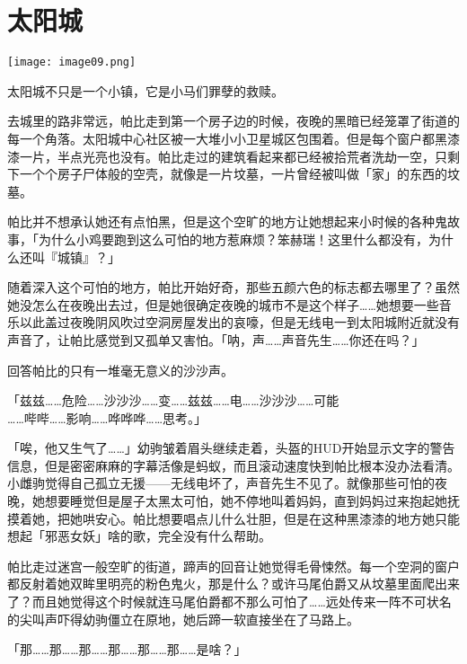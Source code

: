 \chapter{太阳城}

\texttt{[image: image09.png]}

\begin{intro}
太阳城不只是一个小镇，它是小马们罪孽的救赎。
\end{intro}


去城里的路非常远，帕比走到第一个房子边的时候，夜晚的黑暗已经笼罩了街道的每一个角落。太阳城中心社区被一大堆小小卫星城区包围着。但是每个窗户都黑漆漆一片，半点光亮也没有。帕比走过的建筑看起来都已经被拾荒者洗劫一空，只剩下一个个房子尸体般的空壳，就像是一片坟墓，一片曾经被叫做「家」的东西的坟墓。

帕比并不想承认她还有点怕黑，但是这个空旷的地方让她想起来小时候的各种鬼故事，「为什么小鸡要跑到这么可怕的地方惹麻烦？笨赫瑞！这里什么都没有，为什么还叫『城镇』？」

随着深入这个可怕的地方，帕比开始好奇，那些五颜六色的标志都去哪里了？虽然她没怎么在夜晚出去过，但是她很确定夜晚的城市不是这个样子……她想要一些音乐以此盖过夜晚阴风吹过空洞房屋发出的哀嚎，但是无线电一到太阳城附近就没有声音了，让帕比感觉到又孤单又害怕。「呐，声……声音先生……你还在吗？」

回答帕比的只有一堆毫无意义的沙沙声。

「{\mtzh 兹兹……危险……沙沙沙……变……兹兹……电……沙沙沙……可能\\……哔哔……影响……哗哗哗……思考。}」


「唉，他又生气了……」幼驹皱着眉头继续走着，头盔的HUD开始显示文字的警告信息，但是密密麻麻的字幕活像是蚂蚁，而且滚动速度快到帕比根本没办法看清。小雌驹觉得自己孤立无援——无线电坏了，声音先生不见了。就像那些可怕的夜晚，她想要睡觉但是屋子太黑太可怕，她不停地叫着妈妈，直到妈妈过来抱起她抚摸着她，把她哄安心。帕比想要唱点儿什么壮胆，但是在这种黑漆漆的地方她只能想起「邪恶女妖」啥的歌，完全没有什么帮助。

帕比走过迷宫一般空旷的街道，蹄声的回音让她觉得毛骨悚然。每一个空洞的窗户都反射着她双眸里明亮的粉色鬼火，那是什么？或许马尾伯爵又从坟墓里面爬出来了？而且她觉得这个时候就连马尾伯爵都不那么可怕了……远处传来一阵不可状名的尖叫声吓得幼驹僵立在原地，她后蹄一软直接坐在了马路上。

「那……那……那……那……那……那……是啥？」

